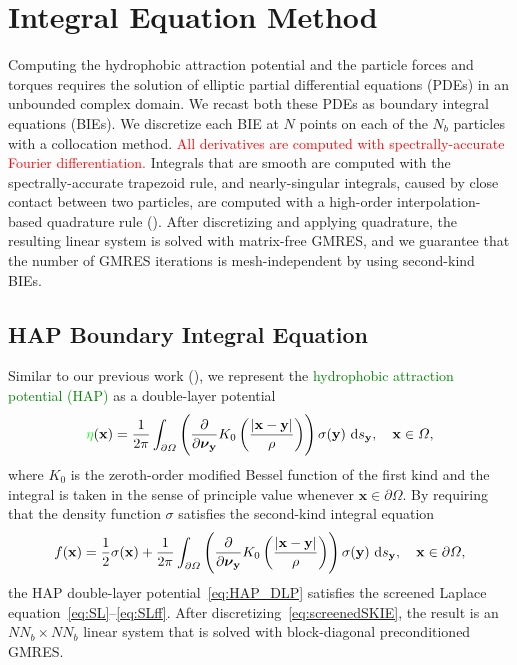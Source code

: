 \documentclass[lineno]{jfm}
\newcommand{\bd}{\partial}
\newcommand{\nnu}{\boldsymbol{\nu}}
\newcommand{\xx}{\mathbf{x}}
\newcommand{\yy}{\mathbf{y}}
\newcommand{\pderiv}[2]{\frac{\partial #1}{\partial #2}}
\newcommand{\ReviewerOne}[1]{\textcolor{red}{#1}}
\newcommand{\ReviewerTwo}[1]{\textcolor{green}{#1}}
\begin{document}



\section{Integral Equation Method}
\label{sec:IEM}
Computing the hydrophobic attraction potential and the particle forces
and torques requires the solution of elliptic partial differential
equations (PDEs) in an unbounded complex domain. We recast both these
PDEs as boundary integral equations (BIEs). We discretize each BIE at
$N$ points on each of the $N_b$ particles with a collocation method.
\ReviewerOne{All derivatives are computed with spectrally-accurate
Fourier differentiation.} Integrals that are smooth are computed with
the spectrally-accurate trapezoid rule, and nearly-singular integrals,
caused by close contact between two particles, are computed with a
high-order interpolation-based quadrature rule (\cite{qua-bir2014}).
After discretizing and applying quadrature, the resulting linear system
is solved with matrix-free GMRES, and we guarantee that the number of
GMRES iterations is mesh-independent by using second-kind BIEs.


\subsection{HAP Boundary Integral Equation}
Similar to our previous work (\cite{Fu20}), we represent the
\ReviewerTwo{hydrophobic attraction potential (HAP)} as a double-layer
potential
\begin{align}
  \label{eq:HAP_DLP}
  \ReviewerTwo{\eta}(\xx) = \frac{1}{2\pi} \int_{\bd\Omega} \left(\pderiv{}{\nnu_\yy}
    K_0 \left(\frac{|\xx - \yy|}{\rho}\right)\right) 
    \sigma(\yy) \, \dif s_\yy, \quad \xx \in \Omega,
\end{align}
where $K_0$ is the zeroth-order modified Bessel function of the first
kind and the integral is taken in the sense of principle value whenever
$\xx \in \partial \Omega$.  By requiring that the density function
$\sigma$ satisfies the second-kind integral equation
\begin{equation}
\label{eq:screenedSKIE}
  f(\xx) = \frac{1}{2}\sigma(\xx) + 
    \frac{1}{2\pi}\int_{\bd\Omega} \left(\pderiv{}{\nnu_\yy}
    K_0 \left(\frac{|\xx - \yy|}{\rho}\right)\right) \sigma(\yy) \, 
    \dif s_\yy, \quad \xx \in \bd\Omega,
\end{equation}
the HAP double-layer potential~\eqref{eq:HAP_DLP} satisfies the screened
Laplace equation~\eqref{eq:SL}--\eqref{eq:SLff}. After
discretizing~\eqref{eq:screenedSKIE}, the result is an $NN_b \times
NN_b$ linear system that is solved with block-diagonal preconditioned
GMRES.
\end{document}
